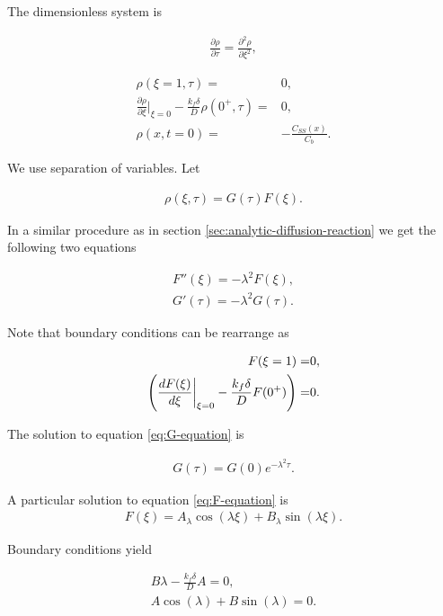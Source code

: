 The dimensionless system is

\begin{align}
		\frac{\partial \rho}{\partial \tau} = \frac{\partial^2 \rho}{\partial \xi^2},
		\label{eq:dynamic-system}
	\end{align}

\begin{align}
			\rho(\xi = 1, \tau) =& 0,\\
		\frac{\partial \rho}{\partial \xi}\big|_{\xi=0} -\frac{k_f\delta}{D}\rho(0^+,\tau) =& 0,\\
		\rho(x, t=0) =& -\frac{C_{SS}(x)}{C_b}.
\end{align}


We use separation of variables. Let

\begin{align}
	\rho(\xi, \tau) =  G(\tau) F(\xi).
\end{align}

In a similar procedure as in section \ref{sec:analytic-diffusion-reaction} we get the following two equations

\begin{align}
	F''(\xi) = -\lambda^2 F(\xi), 
	\label{eq:F-equation}\\
	G'(\tau) = -\lambda^2 G(\tau).
	\label{eq:G-equation}
\end{align}

Note that boundary conditions can be rearrange as


\begin{align}
			F(\xi=1) =& 0,\\
		\left({\frac{d F(\xi)}{d \xi}\bigg|_{\xi=0} -\frac{k_f\delta}{D}F(0^+)}\right) =& 0.
\end{align}


The solution to equation \ref{eq:G-equation} is

\begin{align}
	G(\tau) = G(0)e^{-\lambda^2 \tau}.
\end{align}

A particular solution to equation \ref{eq:F-equation} is
\begin{align}
	F(\xi) = A_\lambda \cos(\lambda \xi) + B_\lambda \sin(\lambda\xi).
\end{align}

Boundary conditions yield

\begin{align}
	B\lambda - \frac{k_f\delta}{D}A = 0,
	\label{eq:border-eq}\\
	A \cos(\lambda) + B \sin(\lambda) = 0.
\end{align}


